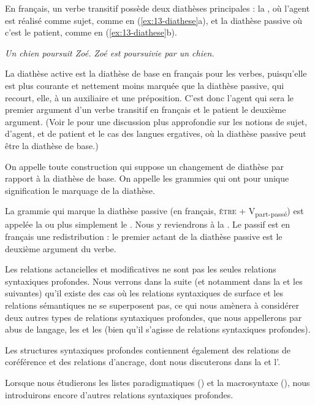En français, un verbe transitif possède deux diathèses principales : la , où l'agent est réalisé comme sujet, comme en (\ref{ex:13-diathese}a),  et la diathèse passive où c'est le patient, comme en (\ref{ex:13-diathese}b).

\ea\label{ex:13-diathese}
\ea \textit{Un chien poursuit Zoé.}
\ex \textit{Zoé est poursuivie par un chien.}\z\z

La diathèse active est la diathèse de base en français pour les verbes, puisqu'elle est plus courante et nettement moins marquée que la diathèse passive, qui recourt, elle, à un auxiliaire et une préposition. C'est donc l'agent qui sera le premier argument d'un verbe transitif en français et le patient le deuxième argument. (Voir le  pour une discussion plus approfondie sur les notions de sujet, d'agent, et de patient et le cas des langues ergatives, où la diathèse passive peut être la diathèse de base.)

{On appelle  toute construction qui suppose un changement de diathèse par rapport à la diathèse de base. On appelle  les grammies qui ont pour unique signification le marquage de la diathèse.}

La grammie qui marque la diathèse passive (en français, \textsc{être} + V\textsubscript{part-passé}) est appelée la  ou plus simplement le . Nous y reviendrons à la . Le passif est en français une redistribution : le premier actant de la diathèse passive est le deuxième argument du verbe.

Les relations actancielles et modificatives ne sont pas les seules relations syntaxiques profondes.
Nous verrons dans la suite (et notamment dans la  et les suivantes) qu’il existe des cas où les relations syntaxiques de surface et les relations sémantiques ne se superposent pas, ce qui nous amènera à considérer deux autres types de relations syntaxiques profondes, que nous appellerons par abus de langage, les  et les  (bien qu'il s'agisse de relations syntaxiques profondes).

Les structures syntaxiques profondes contiennent également des relations de coréférence et des relations d’ancrage, dont nous discuterons dans la  et l’.

Lorsque nous étudierons les listes paradigmatiques () et la macrosyntaxe (), nous introduirons encore d’autres relations syntaxiques profondes.

